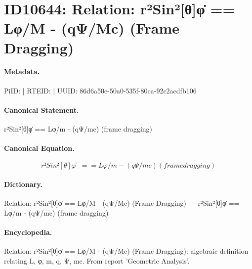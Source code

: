 \section*{ID10644: Relation: r²Sin²[θ]φ̇ == Lφ/M - (qΨ/Mc) (Frame Dragging)}
\paragraph{Metadata.}
PiID:  | RTEID:  | UUID: 86d6a50e-50a0-535f-80ca-92c2acdfb106

\paragraph{Canonical Statement.}
r²Sin²[θ]φ̇ == Lφ/m - (qΨ/mc) (frame dragging)

\paragraph{Canonical Equation.}
\[
r²Sin²[θ]φ̇ == Lφ/m - (qΨ/mc) (frame dragging)
\]

\paragraph{Dictionary.}
Relation: r²Sin²[θ]φ̇ == Lφ/M - (qΨ/Mc) (Frame Dragging) — r²Sin²[θ]φ̇ == Lφ/m - (qΨ/mc) (frame dragging)

\paragraph{Encyclopedia.}
Relation: r²Sin²[θ]φ̇ == Lφ/M - (qΨ/Mc) (Frame Dragging): algebraic definition relating L, φ, m, q, Ψ, mc. From report 'Geometric Analysis'.
